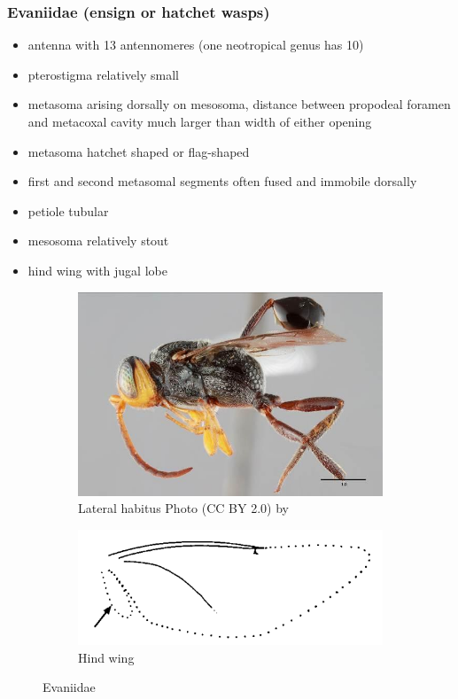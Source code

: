\documentclass[letterpaper, 11pt]{article}
\begin{document}
\subsubsection{Evaniidae (ensign or hatchet wasps)}
\begin{itemize}
\item antenna with 13 antennomeres (one neotropical genus has 10)
\item pterostigma relatively small
\item metasoma arising dorsally on mesosoma, distance between propodeal foramen and metacoxal cavity much larger than width of either opening
\item metasoma hatchet shaped or flag-shaped
\item first and second metasomal segments often fused and immobile dorsally 
\item petiole tubular
\item mesosoma relatively stout
\item hind wing with jugal lobe
\end{itemize}

\begin{figure}[ht!]
  \centering
\begin{subfigure}[ht!]{0.45\textwidth}
    \includegraphics[width=\textwidth]{EvaniidHabitus}
  \caption{Lateral habitus Photo (CC BY 2.0) by \cite{MullinsEtAl2012}}
  \label{fig:evaniid1}
\end{subfigure}
    \hfill
\begin{subfigure}[ht!]{0.45\textwidth}
    \includegraphics[width=\textwidth]{EvaniidWing}
  \caption{Hind wing \citep[][pg. 510]{goulet1993hymenoptera}}
  \label{fig:evaniid2}
\end{subfigure}
    \caption{Evaniidae}
    \label{fig:evaniid}
\end{figure}
\end{document}
